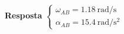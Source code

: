\begin{flushright}
	\textbf{Resposta}
	$
	\begin{cases}
	\omega_{AB}=\SI{1.18}{\radian/\second}\\
	\alpha_{AB}=\SI{15.4}{\radian/\second^{2}}
	\end{cases}
	$
\end{flushright}